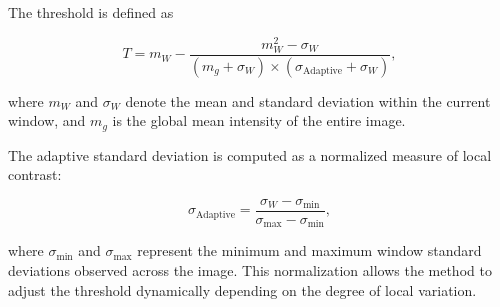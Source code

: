 The threshold is defined as

\begin{equation}
  T = m_W - \frac{m^2_W - \sigma_W}{(m_g + \sigma_W) \times (\sigma_{\text{Adaptive}} + \sigma_W)} ,
\end{equation}

where $m_W$ and $\sigma_W$ denote the mean and standard deviation within the current window, and $m_g$ is the global mean intensity of the entire image.

The adaptive standard deviation is computed as a normalized measure of local contrast:

\begin{equation}
  \sigma_{\text{Adaptive}} = \frac{\sigma_W - \sigma_{\min}}{\sigma_{\max} - \sigma_{\min}},
\end{equation}

where $\sigma_{\min}$ and $\sigma_{\max}$ represent the minimum and maximum window standard deviations observed across the image.
This normalization allows the method to adjust the threshold dynamically depending on the degree of local variation.
